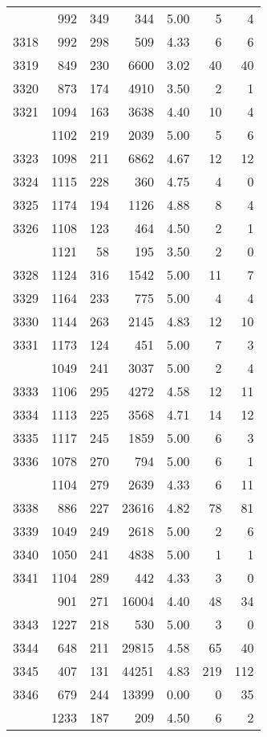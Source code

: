 \documentclass[
]{article}
\begin{document}
\begin{table}
\begin{tabular}[t]{lrrrrrr}
\addlinespace
3317 & 992 & 349 & 344 & 5.00 & 5 & 4\\
3318 & 992 & 298 & 509 & 4.33 & 6 & 6\\
3319 & 849 & 230 & 6600 & 3.02 & 40 & 40\\
3320 & 873 & 174 & 4910 & 3.50 & 2 & 1\\
3321 & 1094 & 163 & 3638 & 4.40 & 10 & 4\\
\addlinespace
3322 & 1102 & 219 & 2039 & 5.00 & 5 & 6\\
3323 & 1098 & 211 & 6862 & 4.67 & 12 & 12\\
3324 & 1115 & 228 & 360 & 4.75 & 4 & 0\\
3325 & 1174 & 194 & 1126 & 4.88 & 8 & 4\\
3326 & 1108 & 123 & 464 & 4.50 & 2 & 1\\
\addlinespace
3327 & 1121 & 58 & 195 & 3.50 & 2 & 0\\
3328 & 1124 & 316 & 1542 & 5.00 & 11 & 7\\
3329 & 1164 & 233 & 775 & 5.00 & 4 & 4\\
3330 & 1144 & 263 & 2145 & 4.83 & 12 & 10\\
3331 & 1173 & 124 & 451 & 5.00 & 7 & 3\\
\addlinespace
3332 & 1049 & 241 & 3037 & 5.00 & 2 & 4\\
3333 & 1106 & 295 & 4272 & 4.58 & 12 & 11\\
3334 & 1113 & 225 & 3568 & 4.71 & 14 & 12\\
3335 & 1117 & 245 & 1859 & 5.00 & 6 & 3\\
3336 & 1078 & 270 & 794 & 5.00 & 6 & 1\\
\addlinespace
3337 & 1104 & 279 & 2639 & 4.33 & 6 & 11\\
3338 & 886 & 227 & 23616 & 4.82 & 78 & 81\\
3339 & 1049 & 249 & 2618 & 5.00 & 2 & 6\\
3340 & 1050 & 241 & 4838 & 5.00 & 1 & 1\\
3341 & 1104 & 289 & 442 & 4.33 & 3 & 0\\
\addlinespace
3342 & 901 & 271 & 16004 & 4.40 & 48 & 34\\
3343 & 1227 & 218 & 530 & 5.00 & 3 & 0\\
3344 & 648 & 211 & 29815 & 4.58 & 65 & 40\\
3345 & 407 & 131 & 44251 & 4.83 & 219 & 112\\
3346 & 679 & 244 & 13399 & 0.00 & 0 & 35\\
\addlinespace
3347 & 1233 & 187 & 209 & 4.50 & 6 & 2\\

\end{tabular}
\end{table}
\end{document}
